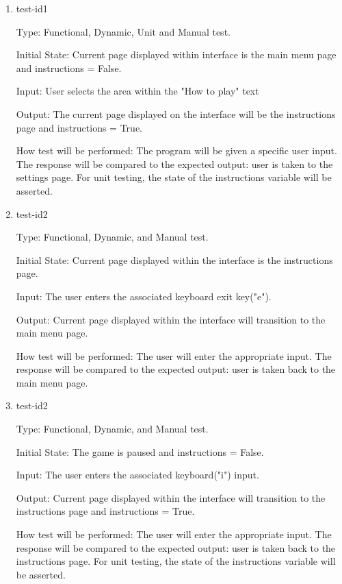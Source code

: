 \documentclass[12pt, titlepage]{article}
\begin{document}
	\begin{enumerate}
		
		\item{test-id1\\}
		
		Type: Functional, Dynamic, Unit and Manual test.
		
		Initial State: Current page displayed within interface is the main menu page and instructions = False.
		
		Input: User selects the area within the "How to play" text
		
		Output: The current page displayed on the interface will be the instructions page and instructions = True.
		
		How test will be performed: The program will be given a specific user input. The response will be compared to the expected output: user is taken to the settings page. For unit testing, the state of the instructions variable will be asserted.
		
		
		\item{test-id2\\}
		
		Type: Functional, Dynamic, and Manual test.
		
		Initial State: Current page displayed within the interface is the instructions page.
		
		Input: The user enters the associated keyboard exit key("e").
		
		Output: Current page displayed within the interface will transition to the main menu page.
		
		How test will be performed: The user will enter the appropriate input. The response will be compared to the expected output: user is taken back to the main menu page.
		
		
		\item{test-id2\\}
		
		Type: Functional, Dynamic, and Manual test.
		
		Initial State:  The game is paused and instructions = False.
		
		Input: The user enters the associated keyboard("i") input.
		
		Output: Current page displayed within the interface will transition to the instructions page and instructions = True.
		
		How test will be performed: The user will enter the appropriate input. The response will be compared to the expected output: user is taken back to the instructions page. For unit testing, the state of the instructions variable will be asserted.
		

\end{enumerate}
\end{document}
